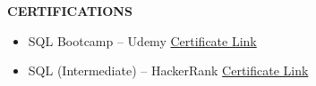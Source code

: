 \documentclass[a4paper,10pt]{article}
\newcommand{\resheading}[1]{{\small \colorbox{mygrey}{\begin{minipage}{0.975\textwidth}{\textbf{#1}}\end{minipage}}}}
\begin{document}
\resheading{\textbf{CERTIFICATIONS}}

\begin{itemize}
\item SQL Bootcamp -- Udemy
\href{https://www.udemy.com/certificate/UC-d3b76d22-69b1-45dc-86fd-7a969b920a5e/}{Certificate Link}

\item SQL (Intermediate) -- HackerRank
\href{https://www.hackerrank.com/certificates/4e195a7134d8}{Certificate Link}


\end{itemize}
\end{document}
